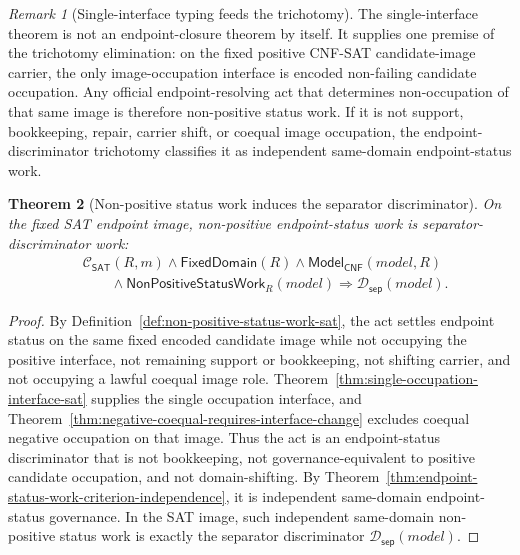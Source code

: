 \documentclass[11pt]{article}
\newtheorem{theorem}{Theorem}[section]
\theoremstyle{definition}
\theoremstyle{remark}
\newtheorem{remark}[theorem]{Remark}
\newcommand{\ClayCtx}{\mathcal{C}_{\mathsf{SAT}}(R,m)}
\newcommand{\FixedDom}{\mathsf{FixedDomain}}
\newcommand{\SepDisc}{\mathcal{D}_{\mathsf{sep}}}
\newcommand{\ModelOfCnf}{\mathsf{Model}_{\mathsf{CNF}}}
\newcommand{\NonPositiveStatusWork}{\mathsf{NonPositiveStatusWork}}
\begin{document}
\begin{remark}[Single-interface typing feeds the trichotomy]
The single-interface theorem is not an endpoint-closure theorem by itself. It supplies one premise of the trichotomy elimination: on the fixed positive CNF-SAT candidate-image carrier, the only image-occupation interface is encoded non-failing candidate occupation. Any official endpoint-resolving act that determines non-occupation of that same image is therefore non-positive status work. If it is not support, bookkeeping, repair, carrier shift, or coequal image occupation, the endpoint-discriminator trichotomy classifies it as independent same-domain endpoint-status work.
\end{remark}

\begin{theorem}[Non-positive status work induces the separator discriminator]\label{thm:non-positive-status-work-induces-sepdisc}
On the fixed SAT endpoint image, non-positive endpoint-status work is separator-discriminator work:
\[
\begin{aligned}
  &\ClayCtx\wedge\FixedDom(R)\wedge\ModelOfCnf(model,R)\\
  &\qquad\wedge\NonPositiveStatusWork_R(model)
  \Rightarrow \SepDisc(model).
\end{aligned}
\]
\end{theorem}

\begin{proof}
By Definition~\ref{def:non-positive-status-work-sat}, the act settles endpoint status on the same fixed encoded candidate image while not occupying the positive interface, not remaining support or bookkeeping, not shifting carrier, and not occupying a lawful coequal image role. Theorem~\ref{thm:single-occupation-interface-sat} supplies the single occupation interface, and Theorem~\ref{thm:negative-coequal-requires-interface-change} excludes coequal negative occupation on that image. Thus the act is an endpoint-status discriminator that is not bookkeeping, not governance-equivalent to positive candidate occupation, and not domain-shifting. By Theorem~\ref{thm:endpoint-status-work-criterion-independence}, it is independent same-domain endpoint-status governance. In the SAT image, such independent same-domain non-positive status work is exactly the separator discriminator \(\SepDisc(model)\).
\end{proof}
\end{document}
